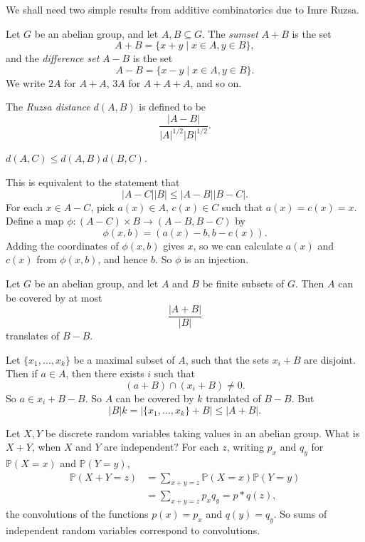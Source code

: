 \documentclass[12pt]{article}
\begin{document}
We shall need two simple results from additive combinatorics due to Imre Ruzsa.

Let $G$ be an abelian group, and let $A, B \subseteq G$. The \emph{sumset} $A + B$ is the set
\[
	A + B = \{x + y \mid x \in A, y \in B\},
\]
and the \emph{difference set} $A - B$ is the set
\[
	A - B = \{x - y\mid x \in A, y \in B\}.
\]
We write $2A$ for $A + A$, $3A$ for $A + A + A$, and so on.

The \emph{Ruzsa distance} $d(A, B)$ is defined to be
\[
\frac{|A - B|}{|A|^{1/2} |B|^{1/2}}.
\]
\begin{lemma}
	$d(A, C) \leq d(A, B) d(B, C)$.
\end{lemma}

\begin{proofbox}
	This is equivalent to the statement that
	\[
	|A - C| |B| \leq |A - B||B - C|.
	\]
	For each $x \in A - C$, pick $a(x) \in A$, $c(x) \in C$ such that $a(x) = c(x) = x$. Define a map $\phi : (A - C) \times B \to (A - B, B - C)$ by
	\[
	\phi(x, b) = (a(x) - b, b - c(x)).
	\]
	Adding the coordinates of $\phi(x, b)$ gives $x$, so we can calculate $a(x)$ and $c(x)$ from $\phi(x, b)$, and hence $b$. So $\phi$ is an injection.
\end{proofbox}

\begin{lemma}
	Let $G$ be an abelian group, and let $A$ and $B$ be finite subsets of $G$. Then $A$ can be covered by at most
	\[
	\frac{|A + B|}{|B|}
	\]
	translates of $B - B$.
\end{lemma}

\begin{proofbox}
	Let $\{x_1, \ldots, x_k\}$ be a maximal subset of $A$, such that the sets $x_i + B$ are disjoint. Then if $a \in A$, then there exists $i$ such that
	\[
		(a + B) \cap (x_i + B) \neq 0.
	\]
	So $a \in x_i + B - B$. So $A$ can be covered by $k$ translated of $B - B$. But
	\[
		|B| k = |\{x_1, \ldots, x_k\} + B| \leq |A + B|.
	\]
\end{proofbox}


Let $X, Y$ be discrete random variables taking values in an abelian group. What is $X + Y$, when $X$ and $Y$ are independent? For each $z$, writing $p_x$ and $q_y$ for $\mathbb{P}(X = x)$ and $\mathbb{P}(Y = y)$,
\begin{align*}
	\mathbb{P}(X + Y = z) &= \sum_{x + y = z} \mathbb{P}(X = x) \mathbb{P}(Y = y) \\
			      &= \sum_{x + y = z} p_x q_y = p \ast q(z),
\end{align*}
the convolutions of the functions $p(x) = p_x$ and $q(y) = q_y$. So sums of independent random variables correspond to convolutions.
\end{document}
